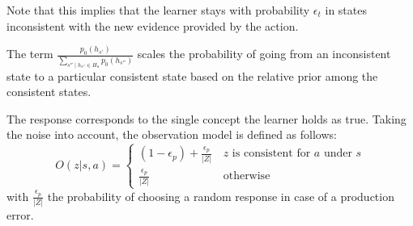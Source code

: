 Note that this implies that the learner stays with probability $\epsilon_t$ in states inconsistent with the new evidence provided by the action.



The term $\frac{p_0(h_{s'})}{\sum_{s'' \mid h_{s''} \in H_a} p_0(h_{s''})}$ scales the probability of going from an inconsistent state to a particular consistent state based on the relative prior among the consistent states. 



The response corresponds to the single concept the learner holds as true.
Taking the noise into account, the observation model is defined as follows:
\begin{equation}
    O(z|s,a) = \begin{cases}
        (1-\epsilon_p)+\frac{\epsilon_p}{|Z|}    & \, z \text{ is consistent for $a$ under $s$} \\
        \frac{\epsilon_p}{|Z|}                   & \, \text{otherwise}
    \end{cases}
\end{equation}
with $\frac{\epsilon_p}{|Z|}$ the probability of choosing a random response in case of a production error.



